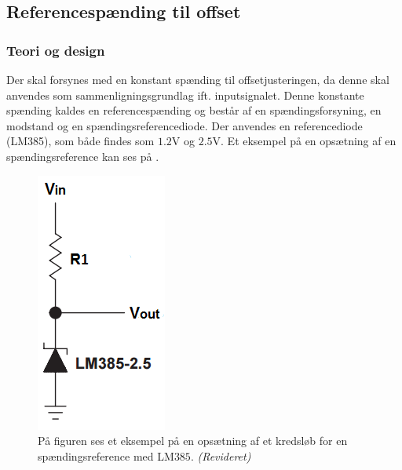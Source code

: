 \subsection{Referencespænding til offset}\label{subsec:Spaendingsref}
\subsubsection{Teori og design}
Der skal forsynes med en konstant spænding til offsetjusteringen, da denne skal anvendes som sammenligningsgrundlag ift. inputsignalet. Denne konstante spænding kaldes en referencespænding og består af en spændingsforsyning, en modstand og en spændingsreferencediode. Der anvendes en referencediode (LM385), som både findes som $1.2$V og $2.5$V. Et eksempel på en opsætning af en spændingsreference kan ses på .

\begin{figure}[H]
	\centering
	\includegraphics[scale=0.7]{figures/cProblemloesning/ReferenceEksempel.PNG}
	\caption{På figuren ses et eksempel på en opsætning af et kredsløb for en spændingsreference med LM$385$. \textit{(Revideret)} \cite{Instruments2005}}
	\label{fig:Spaendingsreference}
\end{figure}

